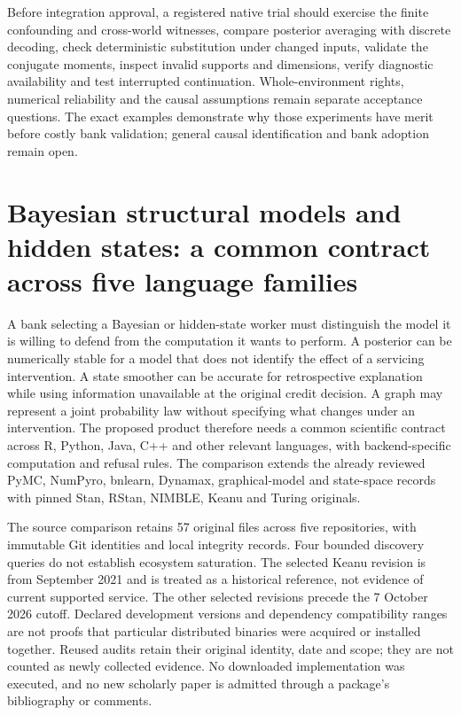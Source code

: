 Before integration approval, a registered native trial should exercise the finite confounding and cross-world witnesses, compare posterior averaging with discrete decoding, check deterministic substitution under changed inputs, validate the conjugate moments, inspect invalid supports and dimensions, verify diagnostic availability and test interrupted continuation. Whole-environment rights, numerical reliability and the causal assumptions remain separate acceptance questions. The exact examples demonstrate why those experiments have merit before costly bank validation; general causal identification and bank adoption remain open. \citep{exec23_numpyro_sources,exec23_numpyro_reference}


\section[Bayesian SCM and hidden-state workers]{Bayesian structural models and hidden states: a common contract across five language families}
\label{sec:exec25-bsw}

A bank selecting a Bayesian or hidden-state worker must distinguish the model it is willing to defend from the computation it wants to perform. A posterior can be numerically stable for a model that does not identify the effect of a servicing intervention. A state smoother can be accurate for retrospective explanation while using information unavailable at the original credit decision. A graph may represent a joint probability law without specifying what changes under an intervention. The proposed product therefore needs a common scientific contract across R, Python, Java, C++ and other relevant languages, with backend-specific computation and refusal rules. The comparison extends the already reviewed PyMC, NumPyro, bnlearn, Dynamax, graphical-model and state-space records with pinned Stan, RStan, NIMBLE, Keanu and Turing originals.~\citep{exec23_pymc_sources,exec23_numpyro_sources,exec24_bnlearn_sources,exec19_dynamax_source,exec24_libdai_source,exec24_opengm_source,exec25_bsw_stan,exec25_bsw_rstan,exec25_bsw_nimble,exec25_bsw_keanu,exec25_bsw_turing,exec25_bsw_choice}

The source comparison retains 57 original files across five repositories, with immutable Git identities and local integrity records. Four bounded discovery queries do not establish ecosystem saturation. The selected Keanu revision is from September 2021 and is treated as a historical reference, not evidence of current supported service. The other selected revisions precede the 7 October 2026 cutoff. Declared development versions and dependency compatibility ranges are not proofs that particular distributed binaries were acquired or installed together. Reused audits retain their original identity, date and scope; they are not counted as newly collected evidence. No downloaded implementation was executed, and no new scholarly paper is admitted through a package's bibliography or comments.~\citep{exec25_bsw_choice}

